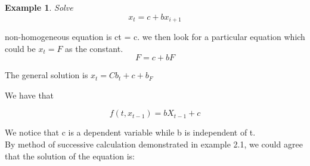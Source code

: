 \documentclass[12pt]{article}
\newtheorem{example}{Example}[section]
\begin{document}
\begin{example}Solve
\begin{equation}\label{DE}
    x_t = c + bx_{i+1}\tag{1.3.6}
\end{equation}
\end{example}

non-homogeneous equation is ct = c. we then look for a particular equation which could be $x_t = F$ as the constant. 
\begin{equation}
    F = c+bF\tag{1.3.7}
\end{equation}

The general solution is $x_t = Cb_t + c+b_F$

We have that

\begin{equation}
f(t, x_{t-1}) = bX_{t-1} + c\tag{1.3.8}
\end{equation}


We notice that c is a dependent variable while b is independent of t.\\
By method of successive calculation demonstrated in example 2.1, we could agree that the solution of the equation is:
\end{document}

